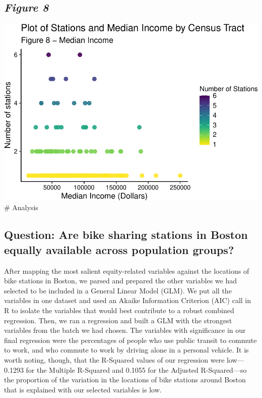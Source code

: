 \documentclass[
  12pt,
]{article}
\begin{document}
\begin{longtable}[]
\hypertarget{figure-8}{%
\subsection{\texorpdfstring{\emph{Figure 8}}{Figure 8}}\label{figure-8}}

\includegraphics{Project_Template_files/figure-latex/data scatterplots income-1.pdf}
\newpage \# Analysis

\hypertarget{question-are-bike-sharing-stations-in-boston-equally-available-across-population-groups}{%
\subsection{Question: Are bike sharing stations in Boston equally
available across population
groups?}\label{question-are-bike-sharing-stations-in-boston-equally-available-across-population-groups}}

After mapping the most salient equity-related variables against the
locations of bike stations in Boston, we parsed and prepared the other
variables we had selected to be included in a General Linear Model
(GLM). We put all the variables in one dataset and used an Akaike
Information Criterion (AIC) call in R to isolate the variables that
would best contribute to a robust combined regression. Then, we ran a
regression and built a GLM with the strongest variables from the batch
we had chosen. The variables with significance in our final regression
were the percentages of people who use public transit to commute to
work, and who commute to work by driving alone in a personal vehicle. It
is worth noting, though, that the R-Squared values of our regression
were low---0.1293 for the Multiple R-Squared and 0.1055 for the Adjusted
R-Squared---so the proportion of the variation in the locations of bike
stations around Boston that is explained with our selected variables is
low.


\end{longtable}
\end{document}
